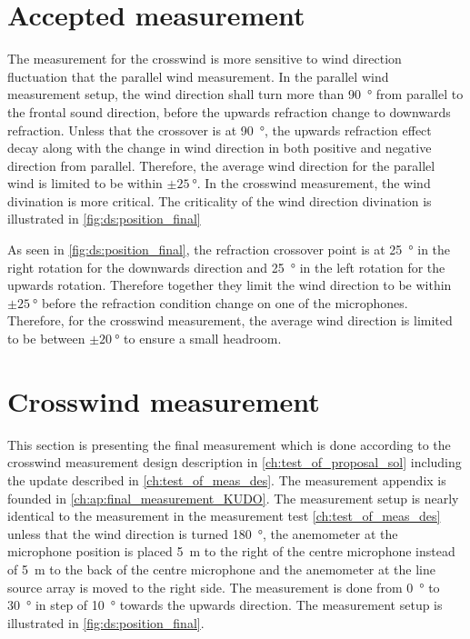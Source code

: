 \section{Accepted measurement}\label{meas:acc_measu}
The measurement for the crosswind is more sensitive to wind direction fluctuation that the parallel wind measurement. In the parallel wind measurement setup, the wind direction shall turn more than \SI{90}{\degree} from parallel to the frontal sound direction, before the upwards refraction change to downwards refraction. Unless that the crossover is at \SI{90}{\degree}, the upwards refraction effect decay along with the change in wind direction in both positive and negative direction from parallel. Therefore, the average wind direction for the parallel wind is limited to be within $\pm\SI{25}{\degree}$. In the crosswind measurement, the wind divination is more critical. The criticality of the wind direction divination is illustrated in \autoref{fig:ds:position_final}


As seen in \autoref{fig:ds:position_final}, the refraction crossover point is at \SI{25}{\degree} in the right rotation for the downwards direction and \SI{25}{\degree} in the left rotation for the upwards rotation. Therefore together they limit the wind direction to be within $\pm\SI{25}{\degree}$ before the refraction condition change on one of the microphones. Therefore, for the crosswind measurement, the average wind direction is limited to be between $\pm\SI{20}{\degree}$ to ensure a small headroom. 


\section{Crosswind measurement}\label{mes:kudo:cross_mes}
This section is presenting the final measurement which is done according to the crosswind measurement design description in \autoref{ch:test_of_proposal_sol} including the update described in \autoref{ch:test_of_meas_des}. The measurement appendix is founded in \autoref{ch:ap:final_measurement_KUDO}. The measurement setup is nearly identical to the measurement in the measurement test \autoref{ch:test_of_meas_des} unless that the wind direction is turned \SI{180}{\degree}, the anemometer at the microphone position is placed \SI{5}{\meter} to the right of the centre microphone instead of \SI{5}{\meter} to the back of the centre microphone and the anemometer at the line source array is moved to the right side. The measurement is done from  \SI{0}{\degree} to  \SI{30}{\degree} in step of  \SI{10}{\degree} towards the upwards direction. The measurement setup is illustrated in \autoref{fig:ds:position_final}.

